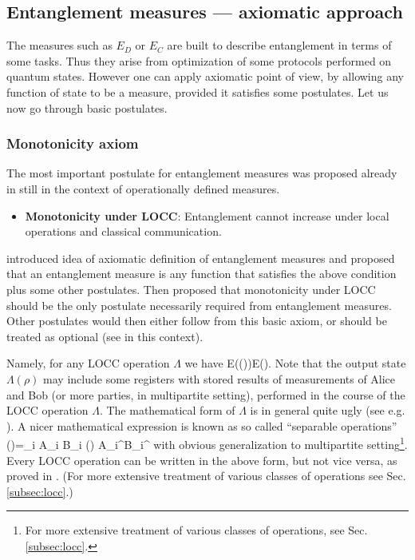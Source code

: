 \documentclass[twocolumn,aps,rmp]{revtex4}
\begin{document}
\subsection{Entanglement measures --- axiomatic approach}
The measures such as $E_D$ or $E_C$ are built to describe entanglement
in terms of some tasks. Thus they  arise  from optimization of some protocols performed
on quantum  states.  However one can apply axiomatic point of view, by allowing
any function of state to be a measure, provided it satisfies some postulates.
Let us now go through basic postulates.


\subsubsection{Monotonicity axiom}
The most important postulate for entanglement measures was proposed already in \cite{BDSW1996}  still in the context of operationally defined measures.

\begin{itemize}
    \item {\bf Monotonicity under LOCC}: Entanglement
cannot increase under local operations and classical communication.
\end{itemize}

\cite{VPRK1997} introduced idea of axiomatic definition of
entanglement measures and proposed that an entanglement
measure is any function that satisfies the above condition
plus some other postulates. Then
\cite{Vidal-mon2000} proposed that monotonicity
under LOCC should be the only postulate necessarily required from
entanglement measures. Other postulates would then either follow from
this basic axiom, or should be treated as optional
(see \cite{popescu-rohrlich} in this context).

Namely, for any LOCC operation $\Lambda$ we have
\be
E(\Lambda(\rho))\leq E(\rho).
\label{eq:mono}
\ee
Note that the output state  $\Lambda(\rho)$ may include some registers with stored
results of measurements of Alice and Bob (or more parties, in multipartite setting),
performed in the course
of the LOCC operation $\Lambda$. The mathematical form of $\Lambda$
is in general quite ugly (see e.g. \cite{DonaldHR2001}). A nicer mathematical expression is known as  so called ``separable operations'' \cite{Rains2001,VPRK1997}
\be
\Lambda(\rho)=\sum_i A_i \ot B_i (\rho) A_i^\dagger \ot B_i^\dagger
\ee
with obvious generalization to multipartite setting\footnote{For more extensive treatment of various classes of operations, see Sec. \ref{subsec:locc}.}.
Every LOCC operation can be written in the above form, but not vice versa, as proved
in \cite{Bennett-nlwe}. (For more extensive treatment of various classes of
operations see Sec. \ref{subsec:locc}.)
\end{document}
